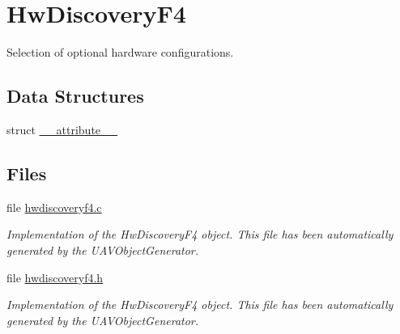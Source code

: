\hypertarget{group___hw_discovery_f4}{\section{\-Hw\-Discovery\-F4}
\label{group___hw_discovery_f4}
}


\-Selection of optional hardware configurations.  


\subsection*{\-Data \-Structures}
\begin{DoxyCompactItemize}
\item 
struct \hyperlink{struct____attribute____}{\-\_\-\-\_\-attribute\-\_\-\-\_\-}
\end{DoxyCompactItemize}
\subsection*{\-Files}
\begin{DoxyCompactItemize}
\item 
file \hyperlink{hwdiscoveryf4_8c}{hwdiscoveryf4.\-c}
\begin{DoxyCompactList}\small\item\em \-Implementation of the \-Hw\-Discovery\-F4 object. \-This file has been automatically generated by the \-U\-A\-V\-Object\-Generator. \end{DoxyCompactList}\item 
file \hyperlink{hwdiscoveryf4_8h}{hwdiscoveryf4.\-h}
\begin{DoxyCompactList}\small\item\em \-Implementation of the \-Hw\-Discovery\-F4 object. \-This file has been automatically generated by the \-U\-A\-V\-Object\-Generator. \end{DoxyCompactList}\end{DoxyCompactItemize}
